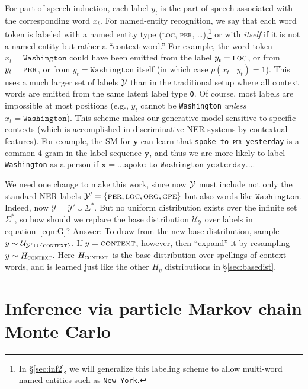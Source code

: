 \documentclass[11pt]{article}
\begin{document}
For part-of-speech induction, each label $y_t$ is the part-of-speech associated with the corresponding word $x_t$. For named-entity recognition, we say that each word token is labeled with a named entity type (\textsc{loc}, \textsc{per}, \ldots),\footnote{In \S\ref{sec:inf2}, we will generalize this labeling scheme to allow multi-word named entities such as \texttt{New York}.}
 or with {\em itself} if it is not a named entity but rather a ``context word.''  For example, the word token $x_t=\texttt{Washington}$ could have been emitted from the label $y_t=\textsc{loc}$, or from $y_t=\textsc{per}$, or from $y_t=\texttt{Washington}$ itself (in which case $p(x_t\mid y_t)=1$).  This uses a much larger set of labels ${\cal Y}$ than in the traditional setup where all context words are emitted from the same latent label type \texttt{O}.  Of course, most labels are impossible at most positions (e.g., $y_t$ cannot be \texttt{Washington} {\em unless} $x_t=\texttt{Washington}$).
This scheme makes our generative model sensitive to specific contexts (which is accomplished in discriminative NER systems by contextual features).  For example, the SM for $\bm{y}$ can learn that \texttt{spoke to \textsc{per} yesterday} is a common 4-gram in the label sequence $\bm{y}$, and thus we are more likely to label \texttt{Washington} as a person if $\bm{x}=\ldots\texttt{spoke to Washington yesterday}\ldots$.

We need one change to make this work, since now $\cal Y$ must include
not only the standard NER labels $\mathcal{Y}' = \{\textsc{per},
\textsc{loc}, \textsc{org}, \textsc{gpe}\}$
but also words like $\texttt{Washington}$.  Indeed, now
$\mathcal{Y} = \mathcal{Y}' \cup \Sigma^*$.  But  
no uniform distribution exists over the infinite set $\Sigma^*$, so how
should we replace the base distribution $\mathcal{U}_{\mathcal{Y}}$
over labels in equation~\eqref{eqn:G}?  Answer: To draw from the new base distribution,
sample $y \sim \mathcal{U}_{\mathcal{Y}' \,\cup\, \{\textsc{context}\}}$.
If $y=\textsc{context}$, however, then ``expand'' it by resampling $y \sim H_{\textsc{context}}$.
Here $H_{\textsc{context}}$ is the base distribution over spellings of context words,
and is learned just like the other $H_y$ distributions in \S\ref{sec:basedist}.

\section{Inference via particle Markov chain Monte Carlo}\label{sec:inference}
\end{document}
